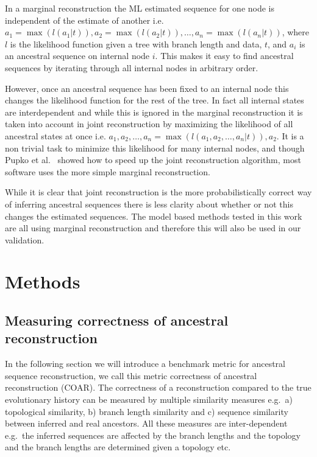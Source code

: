 In a marginal reconstruction the ML estimated sequence for one node is independent of the estimate of another i.e. $a_1 = \operatorname{max}(l(a_1 | t)), a_2 = \operatorname{max}(l(a_2 | t)), \hdots, a_n = \operatorname{max}(l(a_n | t))$, where $l$ is the likelihood function given a tree with branch length and data, $t$, and $a_i$ is an ancestral sequence on internal node $i$.
This makes it easy to find ancestral sequences by iterating through all internal nodes in arbitrary order.

However, once an ancestral sequence has been fixed to an internal node this changes the likelihood function for the rest of the tree.
In fact all internal states are interdependent and while this is ignored in the marginal reconstruction it is taken into account in joint reconstruction by maximizing the likelihood of all ancestral states at once i.e. $a_1, a_2, \hdots, a_n = \operatorname{max}(l(a_1, a_2, \hdots, a_n | t)), a_2$.
It is a non trivial task to minimize this likelihood for many internal nodes, and though Pupko et al.\ \cite{pupko2000fast} showed how to speed up the joint reconstruction algorithm, most software uses the more simple marginal reconstruction.

While it is clear that joint reconstruction is the more probabilistically correct way of inferring ancestral sequences there is less clarity about whether or not this changes the estimated sequences.
The model based methods tested in this work are all using marginal reconstruction and therefore this will also be used in our validation.






\section{Methods}

\subsection{Measuring correctness of ancestral reconstruction}
In the following section we will introduce a benchmark metric for ancestral sequence reconstruction, we call this metric correctness of ancestral reconstruction (COAR).
The correctness of a reconstruction compared to the true evolutionary history can be measured by multiple similarity measures e.g.\ a) topological similarity, b) branch length similarity and c) sequence similarity between inferred and real ancestors.
All these measures are inter-dependent e.g.\ the inferred sequences are affected by the branch lengths and the topology and the branch lengths are determined given a topology etc.


